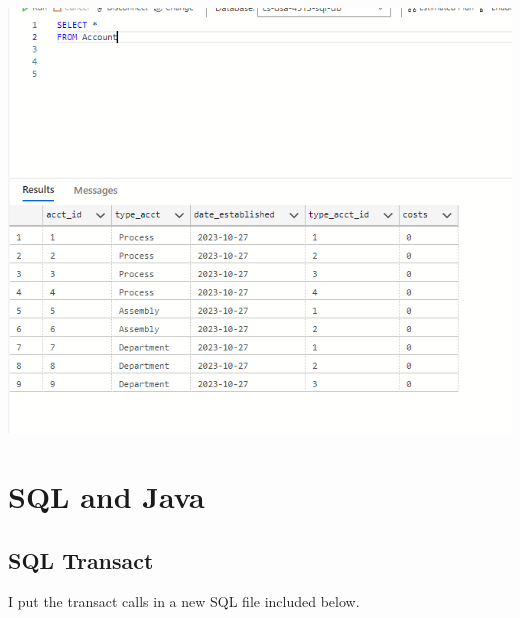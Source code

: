 \documentclass[11pt]{article}
\begin{document}
\includegraphics[width = \textwidth]{accTable.png}

\section{SQL and Java}
\subsection{SQL Transact}
I put the transact calls in a new SQL file included below.
\end{document}
